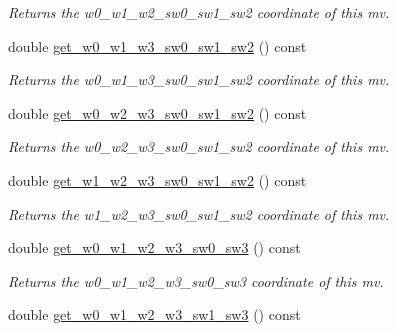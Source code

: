 \begin{DoxyCompactItemize}
\begin{DoxyCompactList}\small\item\em Returns the w0\-\_\-w1\-\_\-w2\-\_\-sw0\-\_\-sw1\-\_\-sw2 coordinate of this mv. \end{DoxyCompactList}\item 
\hypertarget{classe3ga_1_1mv_abd7ed443f9d183e6eaf60a79101111e1}{double \hyperlink{classe3ga_1_1mv_abd7ed443f9d183e6eaf60a79101111e1}{get\-\_\-w0\-\_\-w1\-\_\-w3\-\_\-sw0\-\_\-sw1\-\_\-sw2} () const }\label{classe3ga_1_1mv_abd7ed443f9d183e6eaf60a79101111e1}

\begin{DoxyCompactList}\small\item\em Returns the w0\-\_\-w1\-\_\-w3\-\_\-sw0\-\_\-sw1\-\_\-sw2 coordinate of this mv. \end{DoxyCompactList}\item 
\hypertarget{classe3ga_1_1mv_a5e0555eeb4bea670070c418b0b7fb865}{double \hyperlink{classe3ga_1_1mv_a5e0555eeb4bea670070c418b0b7fb865}{get\-\_\-w0\-\_\-w2\-\_\-w3\-\_\-sw0\-\_\-sw1\-\_\-sw2} () const }\label{classe3ga_1_1mv_a5e0555eeb4bea670070c418b0b7fb865}

\begin{DoxyCompactList}\small\item\em Returns the w0\-\_\-w2\-\_\-w3\-\_\-sw0\-\_\-sw1\-\_\-sw2 coordinate of this mv. \end{DoxyCompactList}\item 
\hypertarget{classe3ga_1_1mv_a19b943705cf36f31667243693772eece}{double \hyperlink{classe3ga_1_1mv_a19b943705cf36f31667243693772eece}{get\-\_\-w1\-\_\-w2\-\_\-w3\-\_\-sw0\-\_\-sw1\-\_\-sw2} () const }\label{classe3ga_1_1mv_a19b943705cf36f31667243693772eece}

\begin{DoxyCompactList}\small\item\em Returns the w1\-\_\-w2\-\_\-w3\-\_\-sw0\-\_\-sw1\-\_\-sw2 coordinate of this mv. \end{DoxyCompactList}\item 
\hypertarget{classe3ga_1_1mv_aeefa06e9c3f22680d4c7e7e29c72e70d}{double \hyperlink{classe3ga_1_1mv_aeefa06e9c3f22680d4c7e7e29c72e70d}{get\-\_\-w0\-\_\-w1\-\_\-w2\-\_\-w3\-\_\-sw0\-\_\-sw3} () const }\label{classe3ga_1_1mv_aeefa06e9c3f22680d4c7e7e29c72e70d}

\begin{DoxyCompactList}\small\item\em Returns the w0\-\_\-w1\-\_\-w2\-\_\-w3\-\_\-sw0\-\_\-sw3 coordinate of this mv. \end{DoxyCompactList}\item 
\hypertarget{classe3ga_1_1mv_a09ab6bae9a75653d7e36937d6e942447}{double \hyperlink{classe3ga_1_1mv_a09ab6bae9a75653d7e36937d6e942447}{get\-\_\-w0\-\_\-w1\-\_\-w2\-\_\-w3\-\_\-sw1\-\_\-sw3} () const }\label{classe3ga_1_1mv_a09ab6bae9a75653d7e36937d6e942447}


\end{DoxyCompactItemize}
